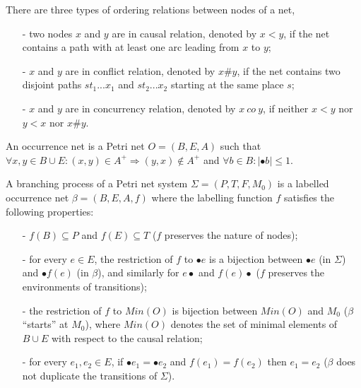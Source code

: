 \documentclass[dvips,...]{llncs}
\begin{document}
\begin{definition}\label{def:orderingRelations}
There are three types of ordering relations between nodes of a net,
	\begin{itemize}
		\item[-] two nodes $x$ and $y$ are in causal relation, denoted by $x<y$, if the net contains a path with at least one arc leading from $x$ to $y$;
		\item[-] $x$ and $y$ are in conflict relation, denoted by $x\#y$, if the net contains two disjoint paths $st_{1}...x_{1}$ and $st_{2}...x_{2}$ starting at the same place $s$;
		\item[-] $x$ and $y$ are in concurrency relation, denoted by $x~co~y$, if neither $x<y$ nor $y<x$ nor $x\#y$.
	\end{itemize}
\end{definition}

\begin{definition}\label{def:occurrenceNet}
An occurrence net is a Petri net $O=(B,E,A)$ such that $\forall x,y\in B\cup E:(x,y)
\in A^{+}\Rightarrow(y,x)\notin A^{+}$ and $\forall b\in B:|\bullet b|\leq 1$.
\end{definition}

\begin{definition}\label{def:branchingProcess}
A branching process of a Petri net system $\Sigma=(P,T,F,M_{0})$ is a labelled occurrence net $\beta=(B,E,A,f)$ where the labelling function $f$ satisfies the following properties:
	\begin{itemize}
		\item[-] $f(B)\subseteq P$ and $f(E)\subseteq T$ ($f$ preserves the nature of nodes);
		\item[-] for every $e\in E$, the restriction of $f$ to $\bullet e$ is a bijection between $\bullet e$ (in $\Sigma$) and $\bullet f(e)$ (in $\beta$), and similarly for $e\bullet$ and $f(e)\bullet$ ($f$ preserves the environments of transitions);
		\item[-] the restriction of $f$ to $Min(O)$ is bijection between $Min(O)$ and $M_{0}$ ($\beta$ ``starts'' at $M_{0}$), where $Min(O)$ denotes the set of minimal elements of $B\cup E$ with respect to the causal relation;
		\item[-] for every $e_{1},e_{2}\in E$, if $\bullet e_{1}=\bullet e_{2}$ and $f(e_{1})=f(e_{2})$ then $e_{1}=e_{2}$ ($\beta$ does not duplicate the transitions of $\Sigma$).
	\end{itemize}
\end{definition}
\end{document}
